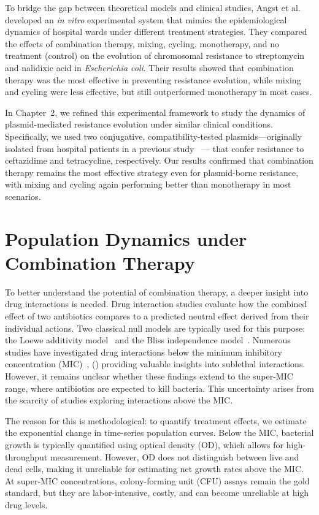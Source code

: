 \documentclass[../main.tex]{subfiles}
\begin{document}
To bridge the gap between theoretical models and clinical studies, Angst et al.~\cite{Angst2021} developed an \textit{in vitro} experimental system that mimics the epidemiological dynamics of hospital wards under different treatment strategies.
They compared the effects of combination therapy, mixing, cycling, monotherapy, and no treatment (control) on the evolution of chromosomal resistance to streptomycin and nalidixic acid in \textit{Escherichia coli}.
Their results showed that combination therapy was the most effective in preventing resistance evolution, while mixing and cycling were less effective, but still outperformed monotherapy in most cases.

In Chapter~2, we refined this experimental framework to study the dynamics of plasmid-mediated resistance evolution under similar clinical conditions.
Specifically, we used two conjugative, compatibility-tested plasmids—originally isolated from hospital patients in a previous study~\cite{Sutter2016} --- that confer resistance to ceftazidime and tetracycline, respectively.
Our results confirmed that combination therapy remains the most effective strategy even for plasmid-borne resistance, with mixing and cycling again performing better than monotherapy in most scenarios.

\section{Population Dynamics under Combination Therapy}
To better understand the potential of combination therapy, a deeper insight into drug interactions is needed.
Drug interaction studies evaluate how the combined effect of two antibiotics compares to a predicted neutral effect derived from their individual actions.
Two classical null models are typically used for this purpose: the Loewe additivity model~\cite{Loewe1926} and the Bliss independence model~\cite{Bliss1939}.
Numerous studies have investigated drug interactions below the minimum inhibitory concentration (MIC)~\cite{Yeh2006}, (\cite{...}) providing valuable insights into sublethal interactions.
However, it remains unclear whether these findings extend to the super-MIC range, where antibiotics are expected to kill bacteria.
This uncertainty arises from the scarcity of studies exploring interactions above the MIC.

The reason for this is methodological: to quantify treatment effects, we estimate the exponential change in time-series population curves.
Below the MIC, bacterial growth is typically quantified using optical density (OD), which allows for high-throughput measurement.
However, OD does not distinguish between live and dead cells, making it unreliable for estimating net growth rates above the MIC.
At super-MIC concentrations, colony-forming unit (CFU) assays remain the gold standard, but they are labor-intensive, costly, and can become unreliable at high drug levels.
\end{document}
